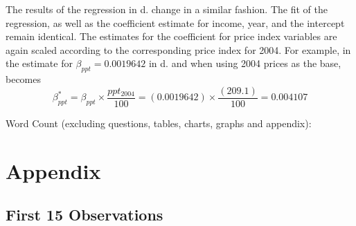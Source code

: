 \documentclass{article}
\begin{document}
\begin{enumerate}[label=\alph*.]
The results of the regression in d. change in a similar fashion. The fit of the regression, as well as the coefficient estimate for income, year, and the intercept remain identical. The estimates for the coefficient for price index variables are again scaled according to the corresponding price index for 2004. For example, in the estimate for $\beta_{ppt} = 0.0019642$ in d. and when using 2004 prices as the base, becomes 
$$\beta_{ppt}^* = \beta_{ppt} \times \frac{ppt_{2004}}{100} = (0.0019642) \times \frac{(209.1)}{100} = 0.004107$$   



\end{enumerate}


Word Count (excluding questions, tables, charts, graphs and appendix): 






\newpage
\section{Appendix}
\hypertarget{first15}{\subsection*{First 15 Observations}}
\end{document}
